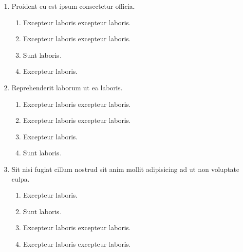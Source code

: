 \documentclass[a4paper,12pt]{article}
\begin{document}
\begin{enumerate}[label=\textbf{\arabic*.}]
\begin{multicols}{2}
\begin{enumerate}
		\item  Sunt laboris.
    
	\end{enumerate}

\end{multicols}
\item Proident eu est ipsum consectetur officia.
\begin{multicols}{2}
	\begin{enumerate}
		\item  Excepteur laboris excepteur laboris.
    
		\item  Excepteur laboris excepteur laboris.
  
		\item  Sunt laboris.
    
		\item  Excepteur laboris.
    
	\end{enumerate}

\end{multicols}
\item Reprehenderit laborum ut ea laboris.
\begin{multicols}{2}
	\begin{enumerate}
		\item  Excepteur laboris excepteur laboris.
    
		\item  Excepteur laboris excepteur laboris.
  
		\item  Excepteur laboris.
    
		\item  Sunt laboris.
    
	\end{enumerate}

\end{multicols}
\item Sit nisi fugiat cillum nostrud sit anim mollit adipisicing ad ut non voluptate culpa.
\begin{multicols}{2}
	\begin{enumerate}
		\item  Excepteur laboris.
    
		\item  Sunt laboris.
    
		\item  Excepteur laboris excepteur laboris.
    
		\item  Excepteur laboris excepteur laboris.
  

\end{enumerate}
\end{multicols}
\end{enumerate}
\end{document}
